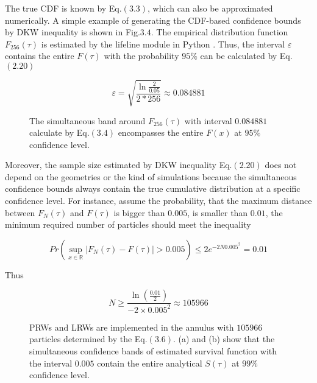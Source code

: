 The true CDF is known by Eq.$(3.3)$, which can also be approximated
numerically. A simple example of generating the CDF-based confidence
bounds by DKW inequality is shown in Fig.$3.4$. The empirical
distribution function $F_{256}(\tau)$ is estimated by the lifeline
module in Python \cite{davidson2019lifelines}. Thus, the interval
$\varepsilon$ contains the entire $F(\tau)$ with the probability
$95\%$ can be calculated by Eq.$(2.20)$

\begin{equation}
  \varepsilon = \sqrt{\frac{\ln{\frac{2}{0.05}}}{2* 256}} \approx 0.084881
\end{equation}

\begin{figure}[h!]
  \centering
  \caption{The simultaneous band around $F_{256}(\tau)$ with interval
    $0.084881$ calculate by Eq.$(3.4)$ encompasses the entire $F(x)$
    at $95\%$ confidence level.}
\end{figure}



Moreover, the sample size estimated by DKW inequality Eq.$(2.20)$ does
not depend on the geometries or the kind of simulations because the
simultaneous confidence bounds always contain the true cumulative
distribution at a specific confidence level. For instance, assume the
probability, that the maximum distance between $F_N(\tau)$ and
$F(\tau)$ is bigger than $0.005$, is smaller than $0.01$, the minimum
required number of particles should meet the inequality

\begin{equation}
  Pr(\sup_{x \in \mathbb{R}} |F_{N}(\tau) - F(\tau)| > 0.005) \leq 2e^{-2N0.005^2} = 0.01
\end{equation}

Thus

\begin{equation}
  N \geq \frac{\ln(\frac{0.01}{2})}{-2 \times 0.005^2} \approx
  105966
\end{equation}


\clearpage

\begin{figure}[h!]
  \centering
  \qquad
  \caption{PRWs and LRWs are implemented in the annulus with $105966$
    particles determined by the Eq.$(3.6)$. (a) and (b) show that the
    simultaneous confidence bands of estimated survival function with
    the interval $0.005$ contain the entire analytical $S(\tau)$ at
    $99 \%$ confidence level.}
\end{figure}

